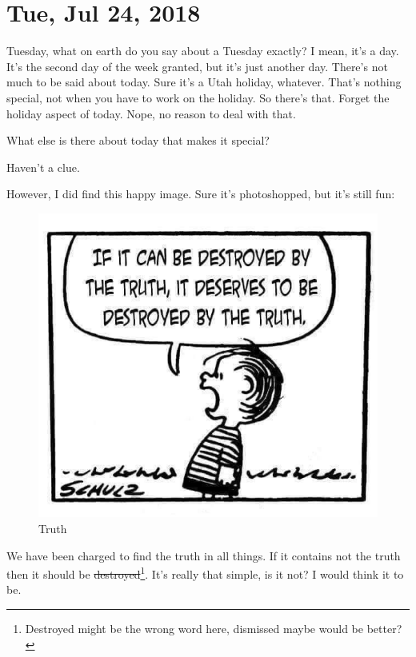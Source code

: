 \section{Tue, Jul 24, 2018}

Tuesday, what on earth do you say about a Tuesday exactly? I mean, it's a day. It's
the second day of the week granted, but it's just another day. There's not much to be
said about today. Sure it's a Utah holiday, whatever. That's nothing special, not
when you have to work on the holiday. So there's that. Forget the holiday aspect of
today. Nope, no reason to deal with that.

What else is there about today that makes it special?

Haven't a clue.

However, I did find this happy image. Sure it's photoshopped, but it's still fun:

\begin{figure}[h!]
  \centering
  \includegraphics[width=0.5\linewidth]{2018/images/truth.jpg}
  \caption{Truth}
  \label{fig:truth}
\end{figure}

We have been charged to find the truth in all things. If it contains not the truth
then it should be \st{destroyed}\footnote{Destroyed might be the wrong word here, 
dismissed maybe would be better?}. It's really that simple, is it not? I would think 
it to be.
